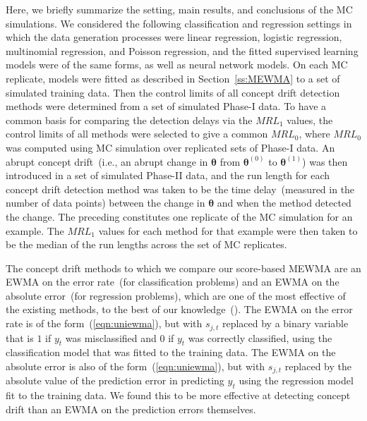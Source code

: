 \documentclass[twoside,11pt]{article}
\begin{document}
Here, we briefly summarize the setting, main results, and conclusions of the MC simulations. We considered the following classification and regression settings in which the data generation processes were linear regression, logistic regression, multinomial regression, and Poisson regression, and the fitted supervised learning models were of the same forms, as well as neural network models. On each MC replicate, models were fitted as described in Section~\ref{ss:MEWMA} to a set of simulated training data. Then the control limits of all concept drift detection methods were determined from a set of simulated Phase-I data. To have a common basis for comparing the detection delays via the $MRL_1$ values, the control limits of all methods were selected to give a common $MRL_0$, where $MRL_0$ was computed using MC simulation over replicated sets of Phase-I data. An abrupt concept drift~(i.e., an abrupt change in $\bm{\theta}$ from $\bm{\theta}^{(0)}$ to $\bm{\theta}^{(1)}$) was then introduced in a set of simulated Phase-II data, and the run length for each concept drift detection method was taken to be the time delay~(measured in the number of data points) between the change in $\bm{\theta}$ and when the method detected the change. The preceding constitutes one replicate of the MC simulation for an example. The $MRL_1$ values for each method for that example were then taken to be the median of the run lengths across the set of MC replicates.

The concept drift methods to which we compare our score-based MEWMA are an EWMA on the error rate~(for classification problems) and an EWMA on the absolute error~(for regression problems), which are one of the most effective of the existing methods, to the best of our knowledge~(\cite{ross2012exponentially,barros2018large,lu2018learning}). The EWMA on the error rate is of the form~(\ref{eqn:uniewma}), but with $s_{j,t}$ replaced by a binary variable that is $1$ if $y_t$ was misclassified and $0$ if $y_t$ was correctly classified, using the classification model that was fitted to the training data. The EWMA on the absolute error is also of the form~(\ref{eqn:uniewma}), but with $s_{j,t}$ replaced by the absolute value of the prediction error in predicting $y_t$ using the regression model fit to the training data. We found this to be more effective at detecting concept drift than an EWMA on the prediction errors themselves. %
\end{document}
